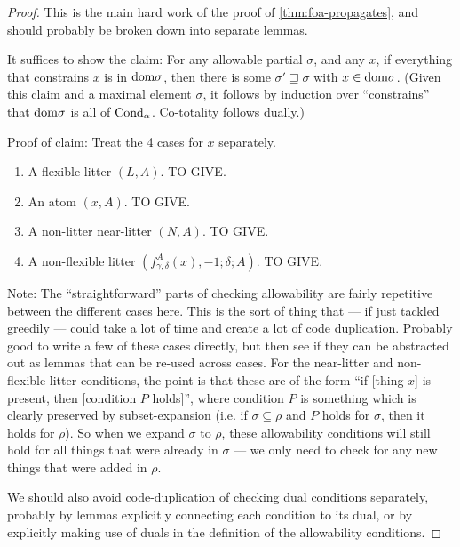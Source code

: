 \begin{proof}
  This is the main hard work of the proof of \cref{thm:foa-propagates}, and should probably be broken down into separate lemmas.

  It suffices to show the claim: For any allowable partial $\sigma$, and any $x$, if everything that constrains $x$ is in $\mathrm{dom} \sigma$, then there is some $\sigma' \sqsupseteq \sigma$ with $x \in \mathrm{dom} \sigma$.  (Given this claim and a maximal element $\sigma$, it follows by induction over “constrains” that $\mathrm{dom} \sigma$ is all of $\mathrm{Cond}_\alpha$. Co-totality follows dually.)

  Proof of claim: Treat the 4 cases for $x$ separately.

  \begin{enumerate}
  \item A flexible litter $(L,A)$.  TO GIVE.
  \item An atom $(x,A)$.  TO GIVE.
  \item A non-litter near-litter $(N,A)$.  TO GIVE.
  \item A non-flexible litter $(f^A_{\gamma,\delta}(x),-1;\delta;A)$.  TO GIVE.
  \end{enumerate}

  Note: The “straightforward” parts of checking allowability are fairly repetitive between the different cases here.  This is the sort of thing that — if just tackled greedily — could take a lot of time and create a lot of code duplication.  Probably good to write a few of these cases directly, but then see if they can be abstracted out as lemmas that can be re-used across cases.  For the near-litter and non-flexible litter conditions, the point is that these are of the form “if [thing $x$] is present, then [condition $P$ holds]”, where condition $P$ is something which is clearly preserved by subset-expansion (i.e. if $\sigma \subseteq \rho$ and $P$ holds for $\sigma$, then it holds for $\rho$). So when we expand $\sigma$ to $\rho$, these allowability conditions will still hold for all things that were already in $\sigma$ — we only need to check for any new things that were added in $\rho$.

  We should also avoid code-duplication of checking dual conditions separately, probably by lemmas explicitly connecting each condition to its dual, or by explicitly making use of duals in the definition of the allowability conditions.
\end{proof}

